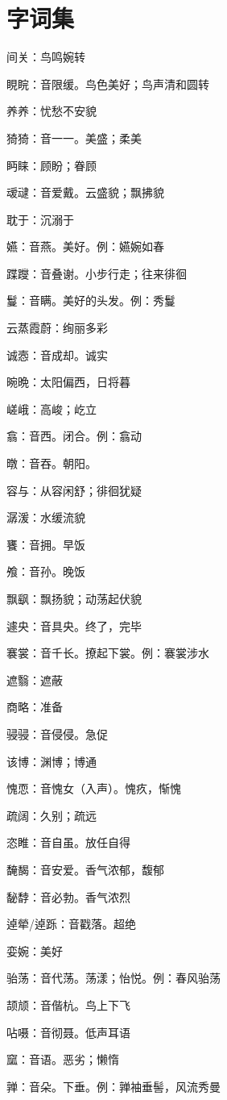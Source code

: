 \section{字词集}
间关：鸟鸣婉转

睍睆：音限缓。鸟色美好；鸟声清和圆转

养养：忧愁不安貌

猗猗：音一一。美盛；柔美

眄睐：顾盼；眷顾

叆叇：音爱戴。云盛貌；飘拂貌

耽于：沉溺于

嬿：音燕。美好。例：嬿婉如春

蹀躞：音叠谢。小步行走；往来徘徊

鬘：音瞒。美好的头发。例：秀鬘

云蒸霞蔚：绚丽多彩

诚悫：音成却。诚实

晼晩：太阳偏西，日将暮

嵯峨：高峻；屹立

翕：音西。闭合。例：翕动

暾：音吞。朝阳。

容与：从容闲舒；徘徊犹疑

潺湲：水缓流貌

饔：音拥。早饭

飧：音孙。晚饭

飘飖：飘扬貌；动荡起伏貌

遽央：音具央。终了，完毕

褰裳：音千长。撩起下裳。例：褰裳涉水

遮翳：遮蔽

商略：准备

骎骎：音侵侵。急促

该博：渊博；博通

愧恧：音愧女（入声）。愧疚，惭愧

疏阔：久别；疏远

恣睢：音自虽。放任自得

馣馤：音安爱。香气浓郁，馥郁

馝馞：音必勃。香气浓烈

逴犖/逴跞：音戳落。超绝

娈婉：美好

骀荡：音代荡。荡漾；怡悦。例：春风骀荡

颉颃：音偕杭。鸟上下飞

呫嗫：音彻聂。低声耳语

窳：音语。恶劣；懒惰

亸：音朵。下垂。例：亸袖垂髻，风流秀曼

